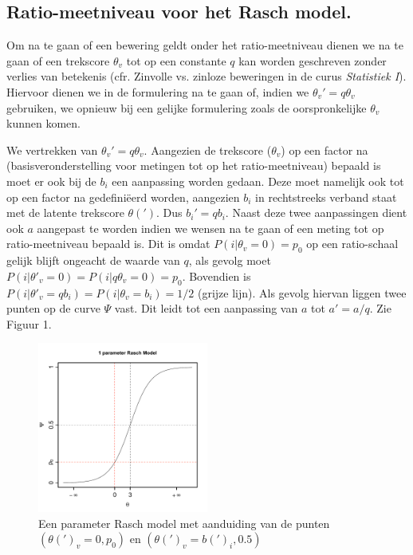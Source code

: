 \documentclass[11pt]{report}
\begin{document}
\subsection*{Ratio-meetniveau voor het Rasch model.}
Om na te gaan of een bewering geldt onder het ratio-meetniveau dienen we na te gaan of een trekscore $\theta_{v}$ tot op een constante $q$ kan worden geschreven zonder verlies van betekenis (cfr. Zinvolle vs. zinloze beweringen in de curus \textit{Statistiek I}). Hiervoor dienen we in de formulering na te gaan of, indien we $\theta_{v}'=q\theta_{v}$ gebruiken, we opnieuw bij een gelijke formulering zoals de oorspronkelijke $\theta_{v}$ kunnen komen.

We vertrekken van $\theta_{v}'=q\theta_{v}$. Aangezien de trekscore ($\theta_{v}$) op een factor na (basisveronderstelling voor metingen tot op het ratio-meetniveau)  bepaald is moet er ook bij de $b_{i}$ een aanpassing worden gedaan. Deze moet namelijk ook tot op een factor na gedefini\"eerd worden, aangezien $b_{i}$ in rechtstreeks verband staat met de latente trekscore $\theta(')$. Dus $b_{i}'=qb_{i}$. Naast deze twee aanpassingen dient ook $a$ aangepast te worden indien we wensen na te gaan of een meting tot op ratio-meetniveau bepaald is. Dit is omdat $P(i| \theta_{v}=0) = p_{0}$ op een ratio-schaal gelijk blijft ongeacht de waarde van $q$, als gevolg moet  $P(i| \theta'_{v}=0) = P(i| q\theta_{v}=0) = p_{0}$. Bovendien is $P(i| \theta'_{v}=qb_{i}) = P(i| \theta_{v}=b_{i}) = 1/2$ (grijze lijn). Als gevolg hiervan liggen twee punten op de curve $\Psi$ vast. Dit leidt tot een aanpassing van $a$ tot $a'=a/q$. Zie Figuur 1.

\begin{figure}[h]
\begin{center}
\includegraphics[width=0.5\textwidth]{addi-multi.pdf}
\caption{Een parameter Rasch model met aanduiding van de punten $(\theta(')_{v}=0, p_{0})$ en $(\theta(')_{v}=b(')_{i}, 0.5)$ }
\label{default}
\end{center}
\end{figure}
\end{document}
